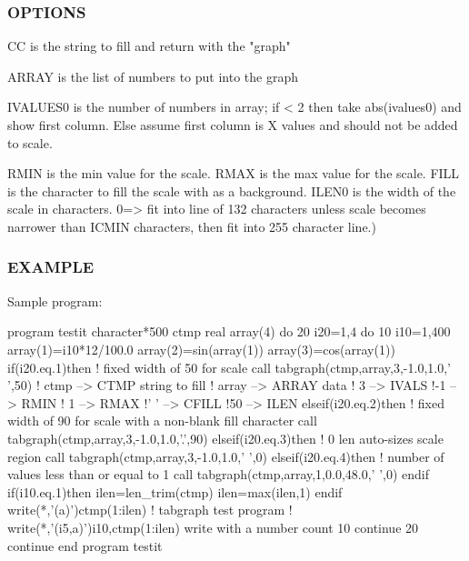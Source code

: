 \subsubsection*{O\+P\+T\+I\+O\+NS}

\begin{DoxyVerb}  CC        is the string to fill and return with the "graph"

  ARRAY     is the list of numbers to put into the graph

  IVALUES0  is the number of numbers in array; if < 2 then take abs(ivalues0)
  and show first column. Else assume first column is X values and should not
  be added to scale.

  RMIN   is the min value for the scale.
  RMAX   is the max value for the scale.
  FILL   is the character to fill the scale with as a background.
  ILEN0  is the width of the scale in characters.
         0=> fit into line of 132 characters unless scale becomes narrower
         than ICMIN characters, then fit into 255 character line.)
\end{DoxyVerb}


\subsubsection*{E\+X\+A\+M\+P\+LE}

Sample program\+: \begin{DoxyVerb} program testit
 character*500 ctmp
 real array(4)
 do 20 i20=1,4
 do 10 i10=1,400
    array(1)=i10*12/100.0
    array(2)=sin(array(1))
    array(3)=cos(array(1))
    if(i20.eq.1)then
       ! fixed width of 50 for scale
       call tabgraph(ctmp,array,3,-1.0,1.0,' ',50)
       ! ctmp  --> CTMP string to fill
       ! array --> ARRAY data
       ! 3     --> IVALS
       !-1     --> RMIN
       ! 1     --> RMAX
       !' '    --> CFILL
       !50     --> ILEN
    elseif(i20.eq.2)then
       ! fixed width of 90 for scale with a non-blank fill character
       call tabgraph(ctmp,array,3,-1.0,1.0,'.',90)
    elseif(i20.eq.3)then
       ! 0 len auto-sizes scale region
       call tabgraph(ctmp,array,3,-1.0,1.0,' ',0)
    elseif(i20.eq.4)then
      ! number of values less than or equal to 1
      call tabgraph(ctmp,array,1,0.0,48.0,' ',0)
    endif
    if(i10.eq.1)then
       ilen=len_trim(ctmp)
       ilen=max(ilen,1)
    endif
    write(*,'(a)')ctmp(1:ilen) ! tabgraph test program
    ! write(*,'(i5,a)')i10,ctmp(1:ilen) write with a number count
 10     continue
 20     continue
 end program testit
\end{DoxyVerb}


